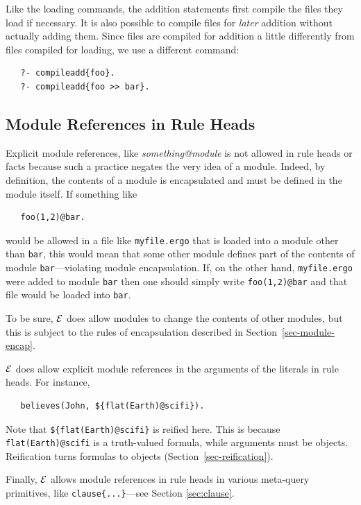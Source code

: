 \documentclass[11pt]{article}
\newcommand{\ERGO}{\mbox{\ensuremath{\cal{E}}\smaller{{\sc{RGO}}}}\xspace}
\newcommand{\FLSYSTEM}{\ERGO}
\newcommand{\ergoext}{ergo\xspace}
\begin{document}
Like the loading commands, the addition statements
first compile the files they load if necessary.
It is also possible to compile files for \emph{later} addition without
actually adding them. Since files are compiled for addition a little
differently from files compiled for loading, we use a different command:
\begin{verbatim}
   ?- compileadd{foo}.
   ?- compileadd{foo >> bar}.
\end{verbatim}

\subsection{Module References in Rule Heads}

Explicit module references, like \emph{something@module} is not allowed in
rule heads or facts because such a practice negates the very idea of a module.
Indeed, by definition, the contents of a module is encapsulated and must be
defined in the module itself. If something like
\begin{verbatim}
   foo(1,2)@bar.
\end{verbatim}
would be allowed in a file like \texttt{myfile.\ergoext} that is loaded into
a module other than \texttt{bar}, this would mean that some other module
defines part of the contents of module \texttt{bar}---violating module
encapsulation. If, on the other hand, \texttt{myfile.\ergoext} were added to
module \texttt{bar} then one should simply write \texttt{foo(1,2)@bar} and
that file would be loaded into \texttt{bar}.

To be sure, \FLSYSTEM does allow modules to change the contents
of other modules, but this is subject to the rules of encapsulation
described in Section~\ref{sec-module-encap}.

\FLSYSTEM does allow explicit module references in the arguments
of the literals in rule heads. For instance,
\begin{verbatim}
   believes(John, ${flat(Earth)@scifi}).
\end{verbatim}
Note that \texttt{\$\{flat(Earth)@scifi\}} is reified here. This is because
\texttt{flat(Earth)@scifi} is a truth-valued formula, while arguments must
be objects. Reification turns formulas to objects
(Section~\ref{sec-reification}).

Finally, \FLSYSTEM allows module references in rule heads in various
meta-query primitives, like \texttt{clause\{...\}}---see Section
\ref{sec:clause}.
\end{document}
